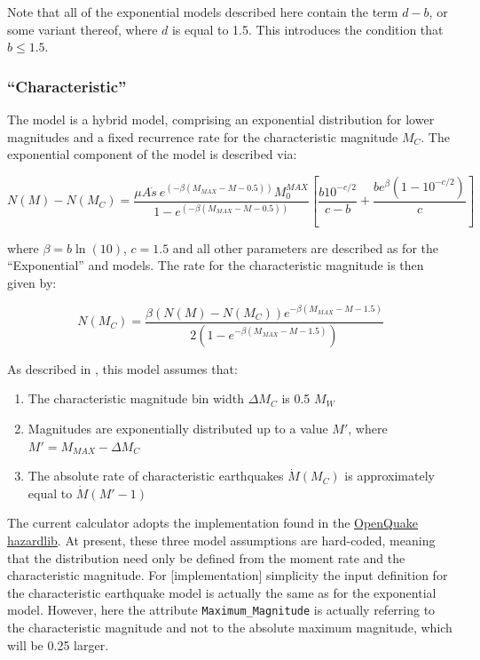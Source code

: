 Note that all of the exponential models described here contain the term $d - b$, or some variant thereof, where $d$ is equal to 1.5. This introduces the condition that $b \leq 1.5$. 

\subsubsection{\cite{YoungsCoppersmith1985} ``Characteristic''}

The \cite{YoungsCoppersmith1985} model is a hybrid model, comprising an exponential distribution for lower magnitudes and a fixed recurrence rate for the characteristic magnitude $M_C$. The exponential component of the model is described via:

\begin{equation}
N \left( M \right) - N \left( {M_C} \right) = \frac{\mu A \dot{s}\ e^{\left( {-\beta \left( {M_{MAX} - M - 0.5} \right)}\right)} M_{0}^{MAX}}{1 - e^{\left( {-\beta \left( {M_{MAX} - M - 0.5} \right)} \right)}} 
 \left[ {\frac{b10^{-c/2}}{c - b} + \frac{b e^{\beta}\left({1 - 10^{-c/2}}\right)}{c}} \right]\end{equation}

where $\beta = b \ln \left( {10} \right)$, $c = 1.5$ and all other parameters are described as for the \cite{YoungsCoppersmith1985} ``Exponential'' and \cite{AndersonLuco1983} models. The rate for the characteristic magnitude is then given by:

\begin{equation}
N \left( {M_C} \right) = \frac{\beta \left( {N \left( M \right) - N \left( {M_C} \right)} \right) e^{-\beta \left( {M_{MAX} - M - 1.5} \right)}}{2 \left( {1 - e^{-\beta \left( {M_{MAX} - M - 1.5} \right)}} \right)}
\end{equation}

As described in \cite{YoungsCoppersmith1985}, this model assumes that:
\begin{enumerate}
\item The characteristic magnitude bin width $\Delta M_C$ is 0.5 $M_W$
\item Magnitudes are exponentially distributed up to a value $M'$, where $M' = M_{MAX} - \Delta M_C$
\item The absolute rate of characteristic earthquakes $\dot{M} \left( {M_C} \right)$ is approximately equal to $\dot{M} \left( {M' - 1} \right)$
\end{enumerate}

The current calculator adopts the implementation found in the \href{http://docs.openquake.org/oq-hazardlib/mfd.html#module-openquake.hazardlib.mfd.youngs_coppersmith_1985}{OpenQuake hazardlib}. At present, these three model assumptions are hard-coded, meaning that the distribution need only be defined from the moment rate and the characteristic magnitude. For [implementation] simplicity the input definition for the characteristic earthquake model is actually the same as for the exponential model. However, here the attribute \verb=Maximum_Magnitude= is actually referring to the characteristic magnitude and not to the absolute maximum magnitude, which will be 0.25 larger. 

